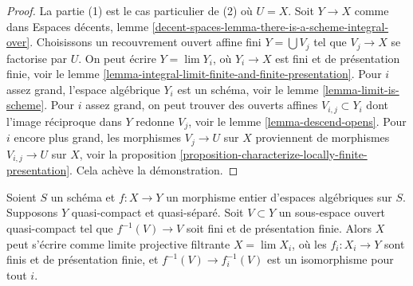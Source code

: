 \begin{proof}
La partie (1) est le cas particulier de (2) où $U = X$.
Soit $Y \to X$ comme dans
Espaces décents, lemme \ref{decent-spaces-lemma-there-is-a-scheme-integral-over}.
Choisissons un recouvrement ouvert affine fini $Y = \bigcup V_j$ tel que $V_j \to X$
se factorise par $U$. On peut écrire $Y = \lim Y_i$, où
$Y_i \to X$ est fini et de présentation finie, voir le
lemme \ref{lemma-integral-limit-finite-and-finite-presentation}.
Pour $i$ assez grand, l'espace algébrique $Y_i$ est un schéma, voir le
lemme \ref{lemma-limit-is-scheme}.
Pour $i$ assez grand, on peut trouver des ouverts affines $V_{i, j} \subset Y_i$
dont l'image réciproque dans $Y$ redonne $V_j$, voir le
lemme \ref{lemma-descend-opens}.
Pour $i$ encore plus grand, les morphismes $V_j \to U$ sur $X$ proviennent
de morphismes $V_{i, j} \to U$ sur $X$, voir la proposition
\ref{proposition-characterize-locally-finite-presentation}.
Cela achève la démonstration.
\end{proof}

\begin{lemma}
\label{lemma-integral-limit-finite-and-finite-presentation-refined}
Soient $S$ un schéma et $f : X \to Y$ un morphisme entier d'espaces
algébriques sur $S$. Supposons $Y$ quasi-compact et quasi-séparé.
Soit $V \subset Y$ un sous-espace ouvert quasi-compact tel que
$f^{-1}(V) \to V$ soit fini et de présentation finie.
Alors $X$ peut s'écrire comme limite projective filtrante $X = \lim X_i$,
où les $f_i : X_i \to Y$ sont finis et de présentation finie,
et $f^{-1}(V) \to f_i^{-1}(V)$ est un isomorphisme pour tout $i$.
\end{lemma}

